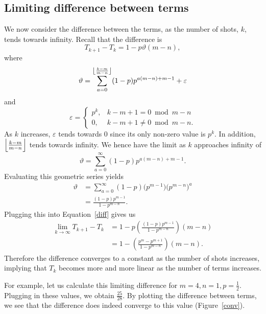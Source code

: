 \subsection{Limiting difference between terms}
We now consider the difference between the terms, as the number of shots, $k$, tends towards infinity. Recall that the difference is 
\begin{equation}\label{diff}
  T_{k+1} - T_{k} = 1 - p\vartheta(m-n),
  \end{equation}
  where \[
\vartheta = \sum_{a=0}^{\floor*{\frac{k-m}{m-n}}} (1-p)p^{a(m-n)+m-1} + \varepsilon
\] and \[
  \varepsilon = 
  \begin{cases}
    p^{k}, &k-m+1 = 0 \bmod m-n \\
    0, &k-m+1 \neq 0 \bmod m-n.
  \end{cases}
\] As $k$ increases, $\varepsilon$ tends towards 0 since its only non-zero value is $p^{k}$. In addition, $\floor*{\frac{k-m}{m-n}}$ tends towards infinity. We hence have the limit as $k$ approaches infinity of \[
  \vartheta = \sum_{a=0}^{\infty} (1-p)p^{a(m-n)+m-1}
.\] Evaluating this geometric series yields
\begin{align*}
  \vartheta &= \sum_{a=0}^{\infty} (1-p)\bigl(p^{m-1}\bigr)\bigl(p^{m-n}\bigr)^{a} \\
            &= \frac{(1-p)p^{m-1}}{1-p^{m-n}}.
\end{align*}
Plugging this into Equation~\ref{diff} gives us
\begin{align}
  \lim_{k \to \infty} T_{k+1} - T_{k} &= 1 - p\left( \frac{(1-p)p^{m-1}}{1-p^{m-n}} \right) (m-n) \nonumber \\
                                      &= 1 - \left( \frac{p^{m} - p^{m+1}}{1-p^{m-n}} \right) (m-n). \label{eq:4}
\end{align}
Therefore the difference converges to a constant as the number of shots increases, implying that $T_k$ becomes more and more linear as the number of terms increases.

For example, let us calculate this limiting difference for $m = 4, n = 1, p = \frac{1}{2}$. Plugging in these values, we obtain $\frac{25}{28}$. By plotting the difference between terms, we see that the difference does indeed converge to this value (Figure~\ref{conv}).

